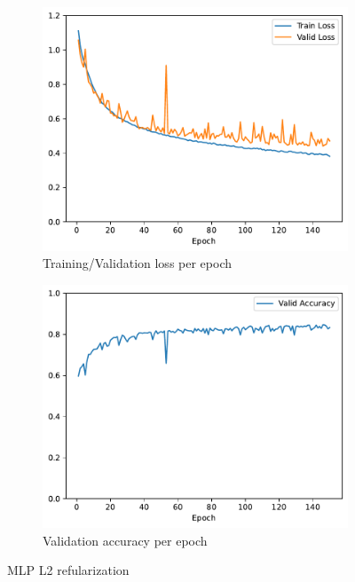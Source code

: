 \documentclass[11pt]{article}
\begin{document}
\begin{figure}[h!]
\centering
\begin{subfigure}{.5\textwidth}
  \centering
  \includegraphics[width=.9\linewidth]{plots/mlp-training-loss-batch-256-lr-0.1-epochs-150-hidden-200-dropout-0-l2-0.0001-layers-1-act-relu-opt-sgd.pdf}
  \caption{Training/Validation loss per epoch}
\end{subfigure}%
\begin{subfigure}{.5\textwidth}
  \centering
  \includegraphics[width=.9\linewidth]{plots/mlp-validation-accuracy-batch-256-lr-0.1-epochs-150-hidden-200-dropout-0-l2-0.0001-layers-1-act-relu-opt-sgd}
  \caption{Validation accuracy per epoch}
\end{subfigure}
\caption{MLP L2 refularization}
\label{fig:MLP_L2_regularization}
\end{figure}
\end{document}

